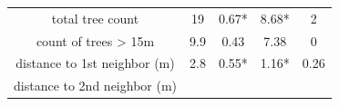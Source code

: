 \documentclass[]{article}
\begin{document}
\begin{longtable}[]{@{}ccccc@{}}
\begin{minipage}[t]{0.28\columnwidth}
total tree count\strut
\end{minipage} & \begin{minipage}[t]{0.13\columnwidth}\centering\strut
19\strut
\end{minipage} & \begin{minipage}[t]{0.24\columnwidth}\centering\strut
0.67*\strut
\end{minipage} & \begin{minipage}[t]{0.08\columnwidth}\centering\strut
8.68*\strut
\end{minipage} & \begin{minipage}[t]{0.13\columnwidth}\centering\strut
2\strut
\end{minipage}\tabularnewline
\begin{minipage}[t]{0.28\columnwidth}\centering\strut
count of trees \textgreater{} 15m\strut
\end{minipage} & \begin{minipage}[t]{0.13\columnwidth}\centering\strut
9.9\strut
\end{minipage} & \begin{minipage}[t]{0.24\columnwidth}\centering\strut
0.43\strut
\end{minipage} & \begin{minipage}[t]{0.08\columnwidth}\centering\strut
7.38\strut
\end{minipage} & \begin{minipage}[t]{0.13\columnwidth}\centering\strut
0\strut
\end{minipage}\tabularnewline
\begin{minipage}[t]{0.28\columnwidth}\centering\strut
distance to 1st neighbor (m)\strut
\end{minipage} & \begin{minipage}[t]{0.13\columnwidth}\centering\strut
2.8\strut
\end{minipage} & \begin{minipage}[t]{0.24\columnwidth}\centering\strut
0.55*\strut
\end{minipage} & \begin{minipage}[t]{0.08\columnwidth}\centering\strut
1.16*\strut
\end{minipage} & \begin{minipage}[t]{0.13\columnwidth}\centering\strut
0.26\strut
\end{minipage}\tabularnewline
\begin{minipage}[t]{0.28\columnwidth}\centering\strut
distance to 2nd neighbor (m)\strut
\end{minipage} & \begin{minipage}[t]{0.13\columnwidth}\centering\strut

\end{minipage}
\end{longtable}
\end{document}
